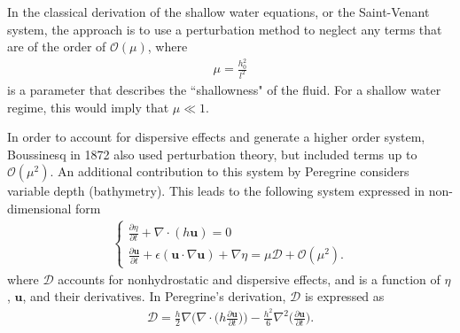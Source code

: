 In the classical derivation of the shallow water equations, or the Saint-Venant system, the approach is to use a perturbation method to neglect any terms that are of the order of $\mathcal{O}(\mu)$, where
\begin{align}
\mu = \frac{h_0^2}{l^2}
\end{align}
is a parameter that describes the ``shallowness" of the fluid. For a shallow water regime, this would imply that $\mu \ll 1$.

In order to account for dispersive effects and generate a higher order system, Boussinesq in 1872 \cite{boussinesq1872theorie} also used perturbation theory, but included terms up to $\mathcal{O}(\mu^2)$. An additional contribution to this system by Peregrine \cite{peregrine1967long} considers variable depth (bathymetry). This leads to the following system expressed in non-dimensional form
\begin{align}
    \begin{cases}
        \frac{\partial \eta}{\partial t} + \nabla \cdot (h \textbf{u}) = 0 \\
        \frac{\partial \textbf{u}}{\partial t} + \epsilon (\textbf{u} \cdot \nabla \textbf{u}) + \nabla \eta = \mu \mathcal{D} + \mathcal{O}(\mu^2).
    \end{cases}
\label{boussinesq_model}
\end{align}
where $\mathcal{D}$ accounts for nonhydrostatic and dispersive effects, and is a function of $\eta$, $\textbf{u}$, and their derivatives. In Peregrine's derivation, $\mathcal{D}$ is expressed as
\begin{align}
\mathcal{D} = \frac{h}{2} \nabla \Big( \nabla \cdot \big( h \frac{\partial \textbf{u}}{\partial t} \big) \Big) - \frac{h^2}{6} \nabla^2 \Big( \frac{\partial \textbf{u}}{\partial t} \Big).
\end{align}


